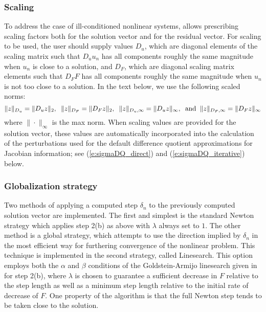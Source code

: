 
\subsubsection*{Scaling}
\label{ss:Scaling}
To address the case of ill-conditioned nonlinear systems, {\kinsol} allows
prescribing scaling factors both for the solution vector and for the residual
vector.
For scaling to be used, the user should supply values $D_u$, which are diagonal
elements of the scaling matrix such that $D_u u_n$ has all components roughly
the same magnitude when $u_n$ is close to a solution, and $D_F$, which are diagonal
scaling matrix elements such that $D_F F$ has all components roughly the same
magnitude when $u_n$ is not too close to a solution.
In the text below, we use the following scaled norms:
\begin{equation}
\|z\|_{D_u} = \|D_u z\|_2, \;\; \|z\|_{D_F} = \|D_F z\|_2, \;\;
\|z\|_{D_u,\infty} = \|D_u z\|_{\infty}, \;\; {\rm and} \;\;
\|z\|_{D_F,\infty} = \|D_F z\|_{\infty}
\end{equation}
where $\| \cdot \|_{\infty}$ is the max norm.  When scaling values are provided
for the solution vector, these values are automatically incorporated into the
calculation of the perturbations used for the default difference quotient
approximations for Jacobian information; see (\ref{e:sigmaDQ_direct}) and
(\ref{e:sigmaDQ_iterative}) below.


\subsubsection*{Globalization strategy}
Two methods of applying a computed step $\delta_n$ to the
previously computed solution vector are implemented. The first and
simplest is the standard Newton strategy which applies step 2(b) as
above with $\lambda$ always set to $1$. The other method is a
global strategy, which attempts to use the direction implied by
$\delta_n$ in the most efficient way for furthering convergence of
the nonlinear problem. This technique is implemented in the second
strategy, called Linesearch.  This option employs both the
$\alpha$ and $\beta$ conditions of the Goldstein-Armijo linesearch
given in \cite{DeSc:96} for step 2(b), where $\lambda$ is chosen
to guarantee a sufficient decrease in $F$ relative to the step
length as well as a minimum step length relative to the initial
rate of decrease of $F$.  One property of the algorithm is that
the full Newton step tends to be taken close to the solution.

